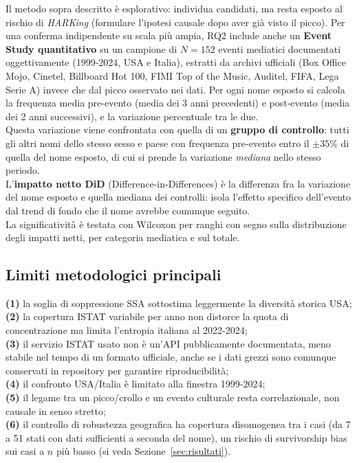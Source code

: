 \documentclass[conference]{IEEEtran}
\begin{document}
Il metodo sopra descritto è esplorativo: individua candidati, ma resta esposto al rischio di
\emph{HARKing} (formulare l'ipotesi causale dopo aver già visto il picco). Per una conferma
indipendente su scala più ampia, RQ2 include anche un \textbf{Event Study quantitativo} su un campione
di $N = 152$ eventi mediatici documentati oggettivamente (1999-2024, USA e Italia), estratti da archivi
ufficiali (Box Office Mojo, Cinetel, Billboard Hot 100, FIMI Top of the Music, Auditel, FIFA, Lega
Serie A) invece che dal picco osservato nei dati. Per ogni nome esposto si calcola la frequenza media
pre-evento (media dei 3 anni precedenti) e post-evento (media dei 2 anni successivi), e la variazione
percentuale tra le due. \\
Questa variazione viene confrontata con quella di un \textbf{gruppo di
controllo}: tutti gli altri nomi dello stesso sesso e paese con frequenza pre-evento entro il
${\pm}35\%$ di quella del nome esposto, di cui si prende la variazione \emph{mediana} nello stesso
periodo. \\
L'\textbf{impatto netto DiD} (Difference-in-Differences) è la differenza fra la variazione del
nome esposto e quella mediana dei controlli: isola l'effetto specifico dell'evento dal trend di fondo
che il nome avrebbe comunque seguito. \\
La significatività è testata con Wilcoxon per ranghi con segno
sulla distribuzione degli impatti netti, per categoria mediatica e sul totale.

\subsection{Limiti metodologici principali}

\textbf{(1)} la soglia di soppressione SSA sottostima leggermente la diversità storica USA; \\
\textbf{(2)} la copertura ISTAT variabile per anno non distorce la quota di concentrazione ma limita
l'entropia italiana al 2022-2024; \\
\textbf{(3)} il servizio ISTAT usato non è un'API pubblicamente
documentata, meno stabile nel tempo di un formato ufficiale, anche se i dati grezzi sono comunque
conservati in repository per garantire riproducibilità; \\
\textbf{(4)} il confronto USA/Italia è
limitato alla finestra 1999-2024; \\
\textbf{(5)} il legame tra un picco/crollo e un evento culturale
resta correlazionale, non causale in senso stretto; \\
\textbf{(6)} il controllo di robustezza geografica
ha copertura disomogenea tra i casi (da 7 a 51 stati con dati sufficienti a seconda del nome), un rischio di
survivorship bias sui casi a $n$ più basso (si veda Sezione~\ref{sec:risultati}).
\end{document}
